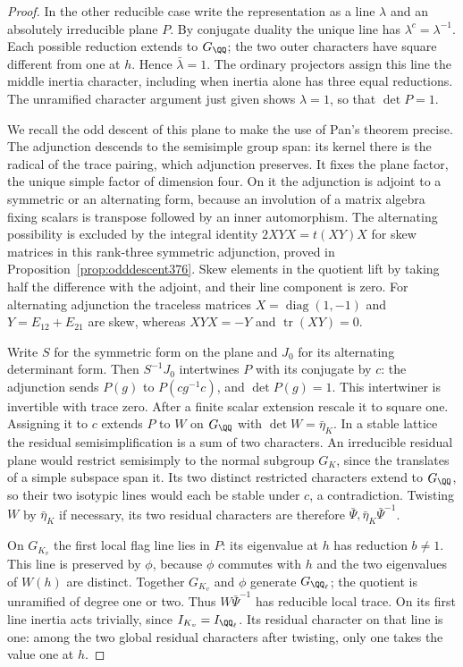 \documentclass[a4paper,11pt]{article}
\theoremstyle{definition}
\theoremstyle{remark}
\numberwithin{equation}{section}
\begin{document}
\begin{proof}
In the other reducible case write the representation as a
line \(\lambda\) and an absolutely irreducible plane \(P\).
By conjugate duality the unique line has
\(\lambda^c=\lambda^{-1}\). Each possible reduction extends
to \(G_\QQ\); the two outer characters have square different
from one at \(h\). Hence \(\bar\lambda=1\). The ordinary
projectors assign this line the middle inertia character,
including when inertia alone has three equal reductions.
The unramified character argument just given shows
\(\lambda=1\), so that \(\det P=1\).

We recall the odd descent of this plane to make the use of
Pan's theorem precise. The adjunction descends to the
semisimple group span: its kernel there is the radical of
the trace pairing, which adjunction preserves. It fixes the
plane factor, the unique simple factor of dimension four.
On it the adjunction is adjoint to a symmetric or an
alternating form, because an involution of a matrix algebra
fixing scalars is transpose followed by an inner
automorphism. The alternating possibility is excluded by
the integral identity \(2XYX=t(XY)X\) for skew matrices in
this rank-three symmetric adjunction, proved in
Proposition~\ref{prop:odddescent376}. Skew elements in the
quotient lift by taking half the difference with the
adjoint, and their line component is zero. For alternating
adjunction the traceless matrices \(X=\operatorname{diag}(1,-1)\)
and \(Y=E_{12}+E_{21}\) are skew, whereas \(XYX=-Y\) and
\(\operatorname{tr}(XY)=0\).

Write \(S\) for the symmetric form on the plane and \(J_0\)
for its alternating determinant form. Then \(S^{-1}J_0\)
intertwines \(P\) with its conjugate by \(c\): the adjunction
sends \(P(g)\) to \(P(cg^{-1}c)\), and \(\det P(g)=1\).
This intertwiner is invertible with trace zero. After a
finite scalar extension rescale it to square one. Assigning
it to \(c\) extends \(P\) to \(W\) on \(G_\QQ\) with
\(\det W=\bar\eta_K\). In a stable lattice the residual
semisimplification is a sum of two characters. An irreducible
residual plane would restrict semisimply to the normal
subgroup \(G_K\), since the translates of a simple subspace
span it. Its two distinct restricted characters extend to
\(G_\QQ\), so their two isotypic lines would each be stable
under \(c\), a contradiction. Twisting \(W\) by \(\bar\eta_K\)
if necessary, its two residual characters are therefore
\(\bar\Psi,\bar\eta_K\bar\Psi^{-1}\).

On \(G_{K_v}\) the first local flag line lies in \(P\):
its eigenvalue at \(h\) has reduction \(b\ne1\).
This line is preserved by \(\phi\), because \(\phi\) commutes
with \(h\) and the two eigenvalues of \(W(h)\) are distinct.
Together \(G_{K_v}\) and \(\phi\) generate \(G_{\QQ_\ell}\);
the quotient is unramified of degree one or two. Thus
\(W\bar\Psi^{-1}\) has reducible local trace. On its first
line inertia acts trivially, since \(I_{K_v}=I_{\QQ_\ell}\).
Its residual character on that line is one: among the two
global residual characters after twisting, only one takes
the value one at \(h\).


\end{proof}
\end{document}
